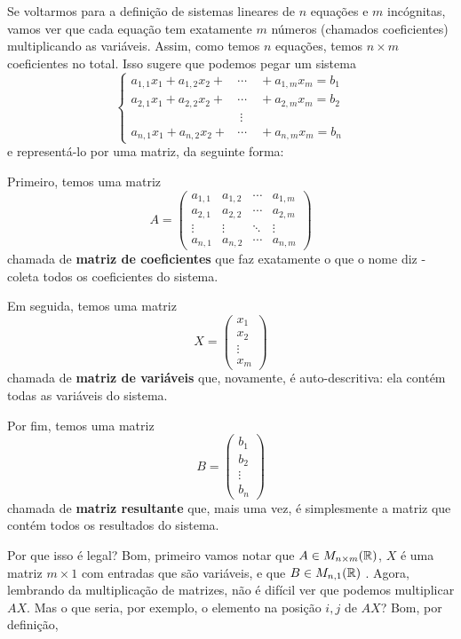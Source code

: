 Se voltarmos para a definição de sistemas lineares de $n$ equações e $m$ incógnitas, vamos ver que cada equação tem exatamente $m$ números (chamados coeficientes) multiplicando as variáveis. Assim, como temos $n$ equações, temos $n\times m$ coeficientes no total. Isso sugere que podemos pegar um sistema
\[
\begin{cases}
a_{1,1}x_1+a_{1,2}x_2+&\cdots\quad+a_{1,m}x_m=b_1\\
a_{2,1}x_1+a_{2,2}x_2+&\cdots\quad+a_{2,m}x_m=b_2\\
&\ \vdots\\
a_{n,1}x_1+a_{n,2}x_2+&\cdots\quad+a_{n,m}x_m=b_n
\end{cases}
\]e representá-lo por uma matriz, da seguinte forma:

Primeiro, temos uma matriz
\[A=\begin{pmatrix}
a_{1,1} & a_{1,2} & \cdots & a_{1,m}\\
a_{2,1} & a_{2,2} & \cdots & a_{2,m}\\
\vdots & \vdots & \ddots & \vdots\\
a_{n,1} & a_{n,2} & \cdots & a_{n,m}
\end{pmatrix}\]chamada de \textbf{matriz de coeficientes} que faz exatamente o que o nome diz - coleta todos os coeficientes do sistema.

Em seguida, temos uma matriz
\[X=\begin{pmatrix}
x_1\\
x_2\\
\vdots\\
x_m
\end{pmatrix}\]chamada de \textbf{matriz de variáveis} que, novamente, é auto-descritiva: ela contém todas as variáveis do sistema.

Por fim, temos uma matriz
\[B=\begin{pmatrix}
b_1\\
b_2\\
\vdots\\
b_n
\end{pmatrix}\] chamada de \textbf{matriz resultante} que, mais uma vez, é simplesmente a matriz que contém todos os resultados do sistema.

Por que isso é legal? Bom, primeiro vamos notar que $A\in M_{n\times m}(\mathbb R)$, $X$ é uma matriz $m\times 1$ com entradas que são variáveis, e que $B\in M_{n,1}(\mathbb R)$ . Agora, lembrando da multiplicação de matrizes, não é difícil ver que podemos multiplicar $AX$. Mas o que seria, por exemplo, o elemento na posição $i,j$ de $AX$? Bom, por definição,

